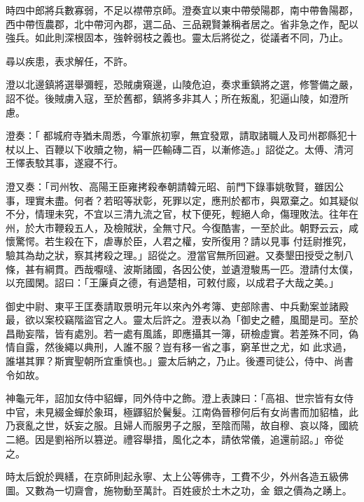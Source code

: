 \begin{pinyinscope}
 時四中郎將兵數寡弱，不足以襟帶京師。澄奏宜以東中帶滎陽郡，南中帶魯陽郡，西中帶恆農郡，北中帶河內郡，選二品、三品親賢兼稱者居之。省非急之作，配以強兵。如此則深根固本，強幹弱枝之義也。靈太后將從之，從議者不同，乃止。



 尋以疾患，表求解任，不許。



 澄以北邊鎮將選舉彌輕，恐賊虜窺邊，山陵危迫，奏求重鎮將之選，修警備之嚴，詔不從。後賊虜入寇，至於舊都，鎮將多非其人；所在叛亂，犯逼山陵，如澄所慮。



 澄奏：「
 都城府寺猶未周悉，今軍旅初寧，無宜發眾，請取諸職人及司州郡縣犯十杖以上、百鞭以下收贖之物，絹一匹輸磚二百，以漸修造。」詔從之。太傅、清河王懌表駮其事，遂寢不行。



 澄又奏：「司州牧、高陽王臣雍拷殺奉朝請韓元昭、前門下錄事姚敬賢，雖因公事，理實未盡。何者？若昭等狀彰，死罪以定，應刑於都市，與眾棄之。如其疑似不分，情理未究，不宜以三清九流之官，杖下便死，輕絕人命，傷理敗法。往年在州，於大市鞭殺五人，及檢賊狀，全無寸尺。今復酷害，一至於此。朝野云云，咸懷驚愕。若生殺在下，虐專於臣，人君之權，安所復用？請以見事
 付廷尉推究，驗其為劫之狀，察其拷殺之理。」詔從之。澄當官無所回避。又奏墾田授受之制八條，甚有綱貫。西哉嚈噠、波斯諸國，各因公使，並遺澄駿馬一匹。澄請付太僕，以充國閑。詔曰：「王廉貞之德，有過楚相，可敕付廄，以成君子大哉之美。」



 御史中尉、東平王匡奏請取景明元年以來內外考簿、吏部除書、中兵勳案並諸殿最，欲以案校竊階盜官之人。靈太后許之。澄表以為「御史之體，風聞是司。至於昌勛妄階，皆有處別。若一處有風謠，即應攝其一簿，研檢虛實。若差殊不同，偽情自露，然後繩以典刑，人誰不服？豈有移一省之事，窮革世之尤，如
 此求過，誰堪其罪？斯實聖朝所宜重慎也。」靈太后納之，乃止。後遷司徒公，侍中、尚書令如故。



 神龜元年，詔加女侍中貂蟬，同外侍中之飾。澄上表諫曰：「高祖、世宗皆有女侍中官，未見綴金蟬於象珥，極鼲貂於鬢髮。江南偽晉穆何后有女尚書而加貂榼，此乃衰亂之世，妖妄之服。且婦人而服男子之服，至陰而陽，故自穆、哀以降，國統二絕。因是劉裕所以篡逆。禮容舉措，風化之本，請依常儀，追還前詔。」帝從之。



 時太后銳於興繕，在京師則起永寧、太上公等佛寺，工費不少，外州各造五級佛圖。又數為一切齋會，施物動至萬計。百姓疲於土木之功，金
 銀之價為之踴上。




\end{pinyinscope}
